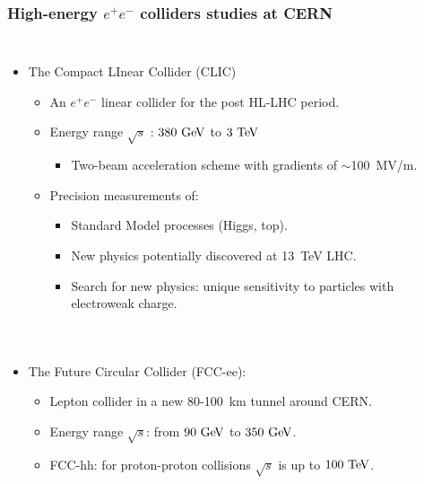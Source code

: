 \begin{frame}
  \frametitle{High-energy $e^+e^-$ colliders studies at CERN}

  \begin{columns}
    \begin{itemize}
    \item The Compact LInear Collider (CLIC)
      \begin{itemize}
      \item An $e^{+}e^{-}$ linear collider for the post HL-LHC period.
      \item Energy range $\sqrt{s}$ : \textcolor{blue}{$380\,\mathrm{\,Ge\kern -0.1em V}$} to
        \textcolor{blue}{$3\,\mathrm{\,Te\kern -0.1em V}$}
        \begin{itemize} 
        \item Two-beam acceleration scheme with gradients of $\sim$100~MV/m.
        \end{itemize}
      \item Precision measurements of:
        \begin{itemize}
        \item Standard Model processes (Higgs, top).
        \item New physics potentially discovered at 13~TeV LHC.
        \item Search for new physics: unique sensitivity to particles with
          electroweak charge.
        \end{itemize}
      \end{itemize}
    \end{itemize}

  \end{columns}
  
  \begin{columns}

    \begin{itemize}
    \item The Future Circular Collider (FCC-ee):
      \begin{itemize}
      \item Lepton collider in a new 80-100~km tunnel around CERN.
      \item Energy range $\sqrt{s}$: from $90\,\mathrm{\,Ge\kern -0.1em V}$ to $350\,\mathrm{\,Ge\kern -0.1em V}$.
      \item FCC-hh: for proton-proton collisions $\sqrt{s}$ is up to $100\,\mathrm{\,Te\kern -0.1em V}$.
      \end{itemize}
    \end{itemize}


\end{columns}
\end{frame}
